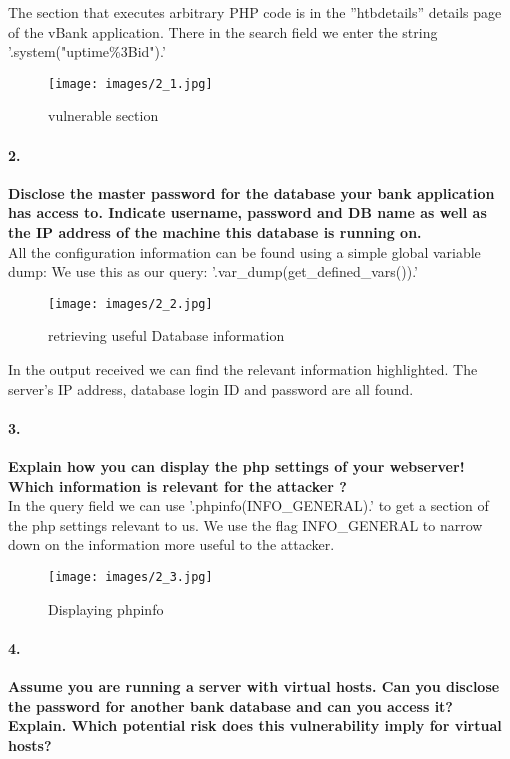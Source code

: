 \documentclass[12pt]{report}
\begin{document}
	The section that executes arbitrary PHP code is in the ''htbdetails'' details page of the vBank application. There in the search field we enter the string {\sf '.system("uptime\%3Bid").'}
	
	\begin{figure}[H]
	\texttt{[image: images/2\_1.jpg]}
	\caption{vulnerable section}
	\end{figure}
	
	\paragraph*{2.}{\bf Disclose the master password for the database your bank application has access to. Indicate username, password and DB name as well as the IP address of the machine this database is running on.}\\
	
	All the configuration information can be found using a simple global variable dump:
	We use this as our query: '.var\_dump(get\_defined\_vars()).'
	
	\begin{figure}[H]
		\texttt{[image: images/2\_2.jpg]}
		\caption{retrieving useful Database information }
	\end{figure}
	
	In the output received we can find the relevant information highlighted. The server's IP address, database login ID and password are all found.
	
	\paragraph*{3.}{\bf Explain how you can display the php settings of your webserver! Which information is relevant for the attacker ?}\\
	
	In the query field we can use '.phpinfo(INFO\_GENERAL).' to get a section of the php settings relevant to us. We use the flag INFO\_GENERAL to narrow down on the information more useful to the attacker.
	
	\begin{figure}[H]
		\texttt{[image: images/2\_3.jpg]}
		\caption{Displaying phpinfo}
	\end{figure}

	\paragraph*{4.}{\bf Assume you are running a server with virtual hosts. Can you disclose the password for another bank database	and can you access it? Explain. Which potential risk does this vulnerability imply for virtual hosts?}\\
	
\end{document}
